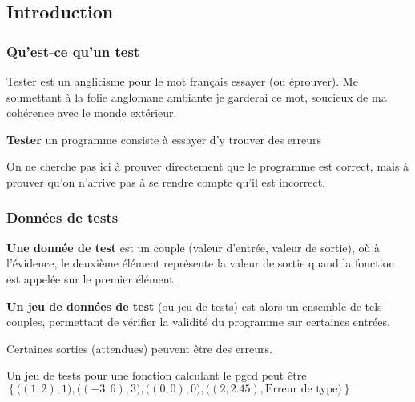 
\subsection{Introduction}

\subsubsection{Qu'est-ce qu'un test}

Tester est un anglicisme pour le mot français essayer (ou éprouver). Me soumettant à la folie anglomane ambiante je garderai ce mot, soucieux de ma cohérence avec le monde extérieur.

\begin{definition}
	\textbf{Tester} un programme consiste à essayer d'y trouver des erreurs
\end{definition}

\begin{rem}
	On ne cherche pas ici à prouver directement que le programme est correct, mais à prouver qu'on n'arrive pas à se rendre compte qu'il est incorrect.
\end{rem}

\subsubsection{Données de tests}

\begin{definition}
	\textbf{Une donnée de test} est un couple (valeur d'entrée, valeur de sortie), où à l'évidence, le deuxième élément représente la valeur de sortie quand la fonction est appelée sur le premier élément.
\end{definition}

\begin{definition}
	\textbf{Un jeu de données de test} (ou jeu de tests) est alors un ensemble de tels couples, permettant de vérifier la validité du programme sur certaines entrées.
\end{definition}

\begin{rem}
	Certaines sorties (attendues) peuvent être des erreurs.
\end{rem}

\begin{example}
	Un jeu de tests pour une fonction calculant le pgcd peut être \\$\left\{ \big((1,2), 1\big), \big((-3, 6), 3\big), \big((0, 0), 0\big), \big((2, 2.45), \text{Erreur de type}\big) \right\}$
\end{example}

